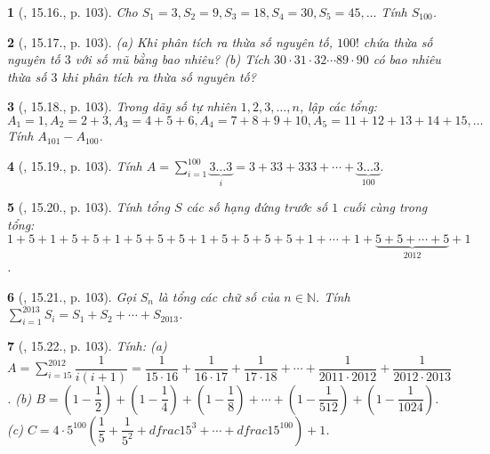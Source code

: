 \documentclass{article}
\newtheorem{baitoan}{}
\begin{document}
\begin{baitoan}[\cite{TLCT_THCS_Toan_6_so_hoc}, 15.16., p. 103]
	Cho $S_1 = 3,S_2 = 9,S_3 = 18,S_4 = 30,S_5 = 45,\ldots$ Tính $S_{100}$.
\end{baitoan}

\begin{baitoan}[\cite{TLCT_THCS_Toan_6_so_hoc}, 15.17., p. 103]
	(a) Khi phân tích ra thừa số nguyên tố, $100!$ chứa thừa số nguyên tố $3$ với số mũ bằng bao nhiêu? (b) Tích $30\cdot31\cdot32\cdots89\cdot90$ có bao nhiêu thừa số $3$ khi phân tích ra thừa số nguyên tố?
\end{baitoan}

\begin{baitoan}[\cite{TLCT_THCS_Toan_6_so_hoc}, 15.18., p. 103]
	Trong dãy số tự nhiên $1,2,3,\ldots,n$, lập các tổng: $A_1 = 1,A_2 = 2 + 3,A_3 = 4 + 5 + 6,A_4 = 7 + 8 + 9 +10,A_5 = 11 + 12 + 13 + 14 + 15,\ldots$ Tính $A_{101} - A_{100}$.
\end{baitoan}

\begin{baitoan}[\cite{TLCT_THCS_Toan_6_so_hoc}, 15.19., p. 103]
	Tính $A = \sum_{i=1}^{100} \underbrace{3\ldots3}_i = 3 + 33 + 333 + \cdots + \underbrace{3\ldots3}_{100}$.
\end{baitoan}

\begin{baitoan}[\cite{TLCT_THCS_Toan_6_so_hoc}, 15.20., p. 103]
	Tính tổng $S$ các số hạng đứng trước số $1$ cuối cùng trong tổng: $1 + 5 + 1 + 5 + 5 + 1 + 5 + 5 + 5 + 1 + 5 + 5 + 5 + 5 + 1 + \cdots + 1 + \underbrace{5 + 5 + \cdots + 5}_{2012} + 1$.
\end{baitoan}

\begin{baitoan}[\cite{TLCT_THCS_Toan_6_so_hoc}, 15.21., p. 103]
	Gọi $S_n$ là tổng các chữ số của $n\in\mathbb{N}$. Tính $\sum_{i=1}^{2013} S_i = S_1 + S_2 + \cdots + S_{2013}$.
\end{baitoan}

\begin{baitoan}[\cite{TLCT_THCS_Toan_6_so_hoc}, 15.22., p. 103]
	Tính: (a) $A = \sum_{i=15}^{2012} \dfrac{1}{i(i + 1)} = \dfrac{1}{15\cdot16} + \dfrac{1}{16\cdot17} + \dfrac{1}{17\cdot18} + \cdots + \dfrac{1}{2011\cdot2012} + \dfrac{1}{2012\cdot2013}$. (b) $B = \left(1 - \dfrac{1}{2}\right) + \left(1 - \dfrac{1}{4}\right) + \left(1 - \dfrac{1}{8}\right) + \cdots + \left(1 - \dfrac{1}{512}\right) + \left(1 - \dfrac{1}{1024}\right)$. (c) $C = 4\cdot5^{100}\left(\dfrac{1}{5} + \dfrac{1}{5^2} + dfrac{1}{5^3} + \cdots + dfrac{1}{5^{100}}\right) + 1$.
\end{baitoan}
\end{document}
